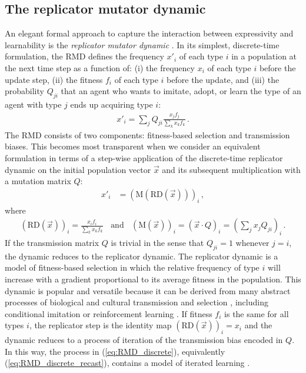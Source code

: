 \documentclass[a4paper, 11pt]{article}
\begin{document}
\subsection{The replicator mutator dynamic}

An elegant formal approach to capture the interaction between expressivity and learnability is
the \emph{replicator mutator dynamic}
\citep{Hofbauer1985:The-Selection-M,nowak+etal:2000,NowakKomarova2001:Evolution-of-Un,hofbauer+sigmund:2003,Nowak2006:Evolutionary-Dy}. In
its simplest, discrete-time formulation, the RMD defines the frequency $x'_i$ of each type $i$
in a population at the next time step as a function of: (i) the frequency $x_i$ of each type
$i$ before the update step, (ii) the fitness $f_i$ of each type $i$ before the update, and
(iii) the probability $Q_{ji}$ that an agent who wants to imitate, adopt, or learn the type of
an agent with type $j$ ends up acquiring type $i$:
\begin{align}
  \label{eq:RMD_discrete}
  x'_i = \sum_j Q_{ji} \frac{x_jf_j}{\sum_k x_k f_k}\,.
\end{align}
The RMD consists of two components: fitness-based selection and transmission biases. This
becomes most transparent when we consider an equivalent formulation in terms of a step-wise
application of the discrete-time replicator dynamic \citep{TaylorJonker1978:Evolutionary-St} on the initial population vector $\vec{x}$
and its subsequent multiplication with a mutation matrix $Q$:
\begin{align}
  \label{eq:RMD_discrete_recast}
  x'_i & = (\text{M}(\text{RD}(\vec{x})))_i\,,
\end{align}
where
\begin{align*}
      \left ( \text{RD}(\vec{x}) \right )_i 
         = \frac{x_i f_i}{\sum_k x_k f_k}
 \ \ \ \ \text{and} \ \ \ \ 
  (\text{M}(\vec{x}))_i = (\vec{x} \cdot Q)_i = \left ( \sum_j
          x_j Q_{ji} \right)_i\,.
\end{align*}
If the transmission matrix $Q$ is trivial in the sense that $Q_{ji}=1$ whenever $j=i$, the
dynamic reduces to the replicator dynamic. The replicator dynamic is a model of fitness-based
selection in which the relative frequency of type $i$ will increase with a gradient
proportional to its average fitness in the population. This dynamic is popular and
versatile because it can be derived from many abstract processes of biological and cultural
transmission and selection \citep[for overview and several derivations
see][]{Sandholm2010:Population-Game}, including conditional imitation
\citep[e.g.,][]{Helbing1996:A-Stochastic-Be,Schlag1998:Why-Imitate-and} or reinforcement
learning \citep[e.g.,][]{BorgersSarin997:Learning-Throug,Beggs2005:On-the-Converge}. If fitness
$f_i$ is the same for all types $i$, the replicator step is the identity map
$ \left ( \text{RD}(\vec{x}) \right )_i = x_i$ and the dynamic reduces to a process of
iteration of the transmission bias encoded in $Q$. In this way, the process in
(\ref{eq:RMD_discrete}), equivalently (\ref{eq:RMD_discrete_recast}), contains a model of
iterated learning \citep{griffiths+kalish:2007}. 
\end{document}
